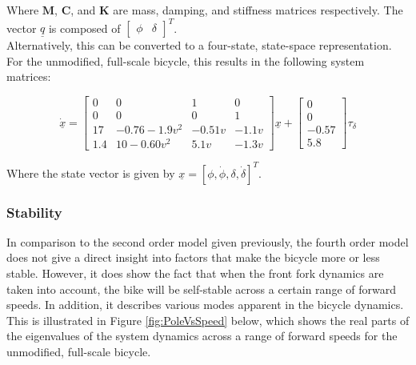 Where $\mathbf{M}$, $\mathbf{C}$, and $\mathbf{K}$ are mass, damping, and stiffness matrices respectively. The vector $\underline{q}$ is composed of $\begin{bmatrix} \phi & \delta \end{bmatrix}^T$. \\

Alternatively, this can be converted to a four-state, state-space representation. For the unmodified, full-scale bicycle, this results in the following system matrices:

\begin{equation*}
\underline{\dot{x}} = 
\begin{bmatrix}
0 & 0 & 1 & 0 \\
0 & 0 & 0 & 1 \\
17 & -0.76 - 1.9v^2 & -0.51v & -1.1v \\
1.4 & 10-0.60v^2 & 5.1v & -1.3v
\end{bmatrix} \underline{x} + \begin{bmatrix}
0 \\
0 \\
-0.57 \\
5.8
\end{bmatrix} \tau_{\delta}
\end{equation*}

Where the state vector is given by $\underline{x} = [\phi, \dot{\phi}, \delta, \dot{\delta}]^T$.

\subsubsection{Stability}
In comparison to the second order model given previously, the fourth order model does not give a direct insight into factors that make the bicycle more or less stable. However, it does show the fact that when the front fork dynamics are taken into account, the bike will be self-stable across a certain range of forward speeds. In addition, it describes various modes apparent in the bicycle dynamics. This is illustrated in Figure \ref{fig:PoleVsSpeed} below, which shows the real parts of the eigenvalues of the system dynamics across a range of forward speeds for the unmodified, full-scale bicycle.

